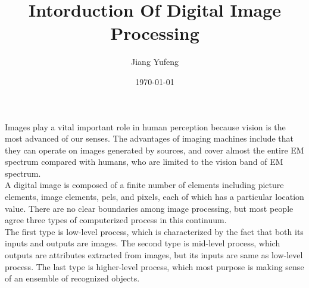 \documentclass[11pt,oneside]{article}
\title{Intorduction Of Digital Image Processing}
\author{Jiang Yufeng}
\date{\today}
\begin{document}
\maketitle
Images play a vital important role in human perception because vision is the most advanced of our senses. The advantages of imaging machines include that they can operate on images generated by sources, and cover almost the entire EM spectrum compared with humans, who are limited to the vision band of EM spectrum.\\
\indent A digital image is composed of a finite number of elements including picture elements, image elements, pels, and pixels, each of which has a particular location value. There are no clear boundaries among image processing, but most people agree three types of computerized process in this continuum.\\
\indent The first type is low-level process, which is characterized by the fact that both its inputs and outputs are images. The second type is mid-level process, which outputs are attributes extracted from images, but its inputs are same as low-level process. The last type is higher-level process, which most purpose is making sense of an ensemble of recognized objects.\\
\end{document}
